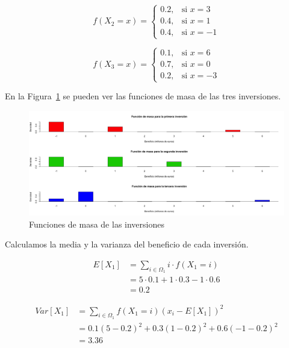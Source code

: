\documentclass[12pt,a4paper,twoside,openright,titlepage,final]{article}
\begin{document}
\begin{equation*}
f(X_2 = x) = \begin{cases}
0.2, & \text{si } x = 3 \\
0.4, & \text{si } x = 1 \\
0.4, & \text{si } x = -1
\end{cases}
\end{equation*}

\begin{equation*}
f(X_3 = x) = \begin{cases}
0.1, & \text{si } x = 6 \\
0.7, & \text{si } x = 0 \\
0.2, & \text{si } x = -3
\end{cases}
\end{equation*}

En la Figura~\ref{fig:funciones_masa_inversiones} se pueden ver las funciones de masa de las tres inversiones.\\ 

\begin{figure}[tbph!]
\centering
\includegraphics[width=0.9\linewidth]{imagenes/funciones_masa_inversiones}
\caption{Funciones de masa de las inversiones}
\label{fig:funciones_masa_inversiones}
\end{figure}

Calculamos la media y la varianza del beneficio de cada inversión.

\begin{align*}
E[X_1] & = \sum_{i \in \Omega_1} i\cdot f(X_1 = i) \\ & = 5 \cdot 0.1 + 1 \cdot 0.3 - 1 \cdot 0.6 \\ & = 0.2
\end{align*}

\begin{align*}
Var[X_1] & = \sum_{i \in \Omega_1} f(X_1 = i) (x_i - E[X_1])^2 \\ & = 0.1(5 - 0.2)^2 + 0.3(1-0.2)^2 + 0.6(-1 - 0.2)^2 \\ & = 3.36
\end{align*}
\end{document}
